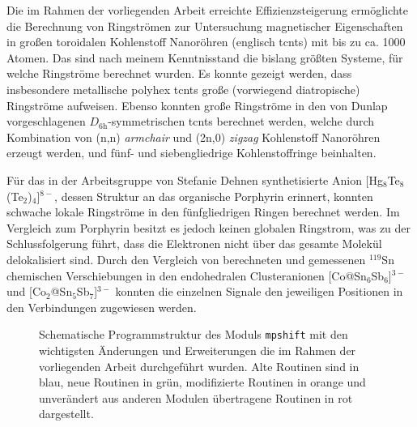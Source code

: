 \bigskip
Die im Rahmen der vorliegenden Arbeit erreichte Effizienzsteigerung ermöglichte die Berechnung von Ringströmen zur Untersuchung magnetischer Eigenschaften in großen toroidalen Kohlenstoff Nanoröhren (englisch \acfp{tcnt}) mit bis zu ca. 1000 Atomen. Das sind nach meinem Kenntnisstand die bislang größten Systeme, für welche Ringströme berechnet wurden. Es konnte gezeigt werden, dass insbesondere metallische polyhex \acp{tcnt} große (vorwiegend diatropische) Ringströme aufweisen. Ebenso konnten große Ringströme in den von Dunlap vorgeschlagenen $D_{\text{6h}}$-symmetrischen \acp{tcnt} berechnet werden, welche durch Kombination von (n,n) \textit{armchair} und (2n,0) \textit{zigzag} Kohlenstoff Nanoröhren erzeugt werden, und fünf- und siebengliedrige Kohlenstoffringe beinhalten.

Für das in der Arbeitsgruppe von Stefanie Dehnen synthetisierte Anion [Hg$_8$Te$_8$(Te$_2$)$_4$]$^{8-}$, dessen Struktur an das organische Porphyrin erinnert, konnten schwache lokale Ringströme in den fünfgliedrigen Ringen berechnet werden. Im Vergleich zum Porphyrin besitzt es jedoch keinen globalen Ringstrom, was zu der Schlussfolgerung führt, dass die Elektronen nicht über das gesamte Molekül delokalisiert sind.
Durch den Vergleich von berechneten und gemessenen $^{119}$Sn chemischen Verschiebungen in den endohedralen Clusteranionen [Co@Sn$_6$Sb$_6$]$^{3-}$ und [Co$_2$@Sn$_5$Sb$_7$]$^{3-}$
konnten die einzelnen Signale den jeweiligen Positionen in den Verbindungen zugewiesen werden.

\begin{figure}[ht!]
	\centering
	\captionsetup{figurewithin = chapter}
	\captionsetup{font=small, labelfont=bf}\caption[Neue schematische Programmstruktur des Moduls \texttt{mpshift}]{Schematische Programmstruktur des Moduls \texttt{mpshift} mit den wichtigsten Änderungen und Erweiterungen die im Rahmen der vorliegenden Arbeit durchgeführt wurden. Alte Routinen sind in blau, neue Routinen in grün, modifizierte Routinen in orange und unverändert aus anderen Modulen übertragene Routinen in rot dargestellt.}
\label{abb:neue_programmstruktur}
\end{figure}
